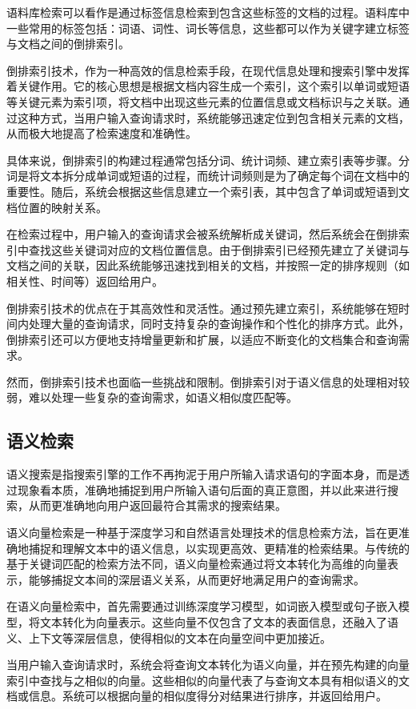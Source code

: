 \documentclass[11pt]{article}
\begin{document}
\begin{CJK*}{UTF8}{gbsn}
语料库检索可以看作是通过标签信息检索到包含这些标签的文档的过程。语料库中一些常用的标签包括：词语、词性、词长等信息，这些都可以作为关键字建立标签与文档之间的倒排索引。

倒排索引技术，作为一种高效的信息检索手段，在现代信息处理和搜索引擎中发挥着关键作用。它的核心思想是根据文档内容生成一个索引，这个索引以单词或短语等关键元素为索引项，将文档中出现这些元素的位置信息或文档标识与之关联。通过这种方式，当用户输入查询请求时，系统能够迅速定位到包含相关元素的文档，从而极大地提高了检索速度和准确性。

具体来说，倒排索引的构建过程通常包括分词、统计词频、建立索引表等步骤。分词是将文本拆分成单词或短语的过程，而统计词频则是为了确定每个词在文档中的重要性。随后，系统会根据这些信息建立一个索引表，其中包含了单词或短语到文档位置的映射关系。

在检索过程中，用户输入的查询请求会被系统解析成关键词，然后系统会在倒排索引中查找这些关键词对应的文档位置信息。由于倒排索引已经预先建立了关键词与文档之间的关联，因此系统能够迅速找到相关的文档，并按照一定的排序规则（如相关性、时间等）返回给用户。

倒排索引技术的优点在于其高效性和灵活性。通过预先建立索引，系统能够在短时间内处理大量的查询请求，同时支持复杂的查询操作和个性化的排序方式。此外，倒排索引还可以方便地支持增量更新和扩展，以适应不断变化的文档集合和查询需求。

然而，倒排索引技术也面临一些挑战和限制。倒排索引对于语义信息的处理相对较弱，难以处理一些复杂的查询需求，如语义相似度匹配等。

\subsection{语义检索}

语义搜索是指搜索引擎的工作不再拘泥于用户所输入请求语句的字面本身，而是透过现象看本质，准确地捕捉到用户所输入语句后面的真正意图，并以此来进行搜索，从而更准确地向用户返回最符合其需求的搜索结果。

语义向量检索是一种基于深度学习和自然语言处理技术的信息检索方法，旨在更准确地捕捉和理解文本中的语义信息，以实现更高效、更精准的检索结果。与传统的基于关键词匹配的检索方法不同，语义向量检索通过将文本转化为高维的向量表示，能够捕捉文本间的深层语义关系，从而更好地满足用户的查询需求。

在语义向量检索中，首先需要通过训练深度学习模型，如词嵌入模型或句子嵌入模型，将文本转化为向量表示。这些向量不仅包含了文本的表面信息，还融入了语义、上下文等深层信息，使得相似的文本在向量空间中更加接近。

当用户输入查询请求时，系统会将查询文本转化为语义向量，并在预先构建的向量索引中查找与之相似的向量。这些相似的向量代表了与查询文本具有相似语义的文档或信息。系统可以根据向量的相似度得分对结果进行排序，并返回给用户。


\end{CJK*}
\end{document}
